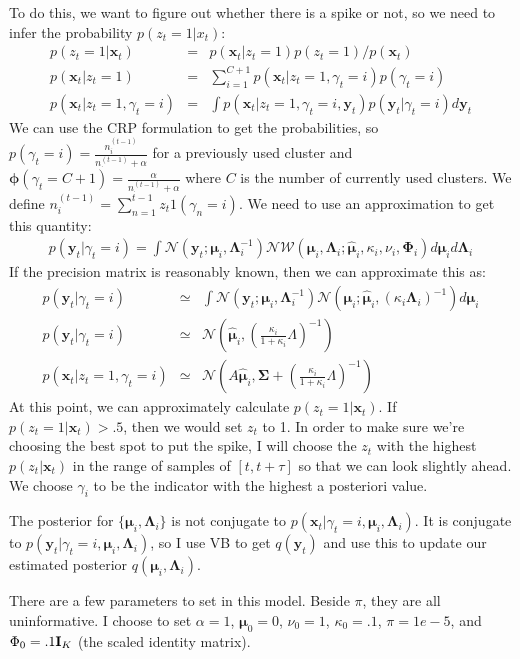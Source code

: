 \documentclass{article} %
\newcommand{\beqs}{\begin{eqnarray}}
\newcommand{\eeqs}{\end{eqnarray}}
\newcommand{\Imat}{{\bf I}}
\newcommand{\xv}{\boldsymbol{x}}
\newcommand{\yv}{\boldsymbol{y}}
\newcommand{\Lambdamat}{\boldsymbol{\Lambda}}
\newcommand{\Sigmamat}{\boldsymbol{\Sigma}}
\newcommand{\Phimat}{\boldsymbol{\Phi}}
\newcommand{\muv}{\boldsymbol{\mu}}
\newcommand{\phiv}{\boldsymbol{\phi}}
\newcommand{\p}{\phiv}  %
\begin{document}
To do this, we want to figure out whether there is a spike or not, so we need to infer the probability $p(z_t=1|x_t)$:
\beqs
p(z_t=1|\xv_t)&=&p(\xv_t|z_t=1)p(z_t=1)/p(\xv_t)\\
p(\xv_t|z_t=1)&=&\sum_{i=1}^{C+1}p(\xv_t|z_t=1,\gamma_t=i)p(\gamma_t=i)\\
p(\xv_t|z_t=1,\gamma_t=i)&=&\int p(\xv_t|z_t=1,\gamma_t=i,\yv_t)p(\yv_t|\gamma_t=i)d\yv_t
\eeqs
We can use the CRP formulation to get the probabilities, so $p(\gamma_t=i)=\frac{n^{(t-1)}_i}{n_{\cdot}^{(t-1)}+\alpha}$ for a previously used cluster and $\p(\gamma_t=C+1)=\frac{\alpha}{n_{\cdot}^{(t-1)}+\alpha}$ where $C$ is the number of currently used clusters. We define $n^{(t-1)}_i=\sum_{n=1}^{t-1}z{_t}1(\gamma_n=i)$. We need to use an approximation to get this quantity:
\beqs
p(\yv_t|\gamma_t=i)=\int\mathcal{N}(\yv_t;\muv_i,\Lambdamat_i^{-1})\mathcal{NW}(\muv_i,\Lambdamat_i;\hat{\muv}_i,\kappa_i,\nu_i,\Phimat_i)d\muv_id\Lambdamat_i
\eeqs
If the precision matrix is reasonably known, then we can approximate this as:
\beqs
p(\yv_t|\gamma_t=i)&\simeq&\int\mathcal{N}(\yv_t;\muv_i,\Lambdamat_i^{-1})\mathcal{N}(\muv_i;\hat{\muv}_i,(\kappa_i\Lambdamat_i)^{-1})d\muv_i\\
p(\yv_t|\gamma_t=i)&\simeq&\mathcal{N}\left(\hat{\muv}_i,(\frac{\kappa_i}{1+\kappa_i}\Lambda)^{-1}\right)\\
p(\xv_t|z_t=1,\gamma_t=i)&\simeq&\mathcal{N}\left(A\hat{\muv}_i,\Sigmamat+(\frac{\kappa_i}{1+\kappa_i}\Lambda)^{-1}\right)
\eeqs
At this point, we can approximately calculate $p(z_t=1|\xv_t)$.  If $p(z_t=1|\xv_t)>.5$, then we would set $z_t$ to 1. In order to make sure we're choosing the best spot to put the spike, I will choose the $z_t$ with the highest $p(z_t|\xv_t)$ in the range of samples of $[t,t+\tau]$ so that we can look slightly ahead.  We choose $\gamma_i$ to be the indicator with the highest a posteriori value.

The posterior for $\{\muv_i,\Lambdamat_i\}$ is not conjugate to $p(\xv_t|\gamma_t=i,\muv_i,\Lambdamat_i)$.  It is conjugate to $p(\yv_t|\gamma_t=i,\muv_i,\Lambdamat_i)$, so I use VB to get $q(\yv_t)$ and use this to update our estimated posterior $q(\muv_i,\Lambdamat_i)$.

There are a few parameters to set in this model.  Beside $\pi$, they are all uninformative. I choose to set $\alpha=1$, $\muv_0=0$, $\nu_0=1$, $\kappa_0=.1$, $\pi=1e-5$, and $\Phi_0=.1\Imat_K$ (the scaled identity matrix).
\end{document}

